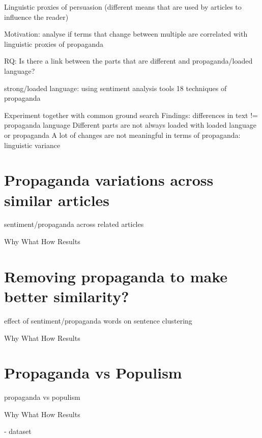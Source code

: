 \label{chap:linguistic_persuasion}

Linguistic proxies of persuasion (different means that are used by articles to influence the reader)

Motivation: analyse if terms that change between multiple are correlated with linguistic proxies of propaganda


RQ: Is there a link between the parts that are different and propaganda/loaded language? 


strong/loaded language: using sentiment analysis tools 
18 techniques of propaganda


Experiment together with common ground search
Findings: differences in text != propaganda language
Different parts are not always loaded with loaded language or propaganda
A lot of changes are not meaningful in terms of propaganda: linguistic variance


\section{Propaganda variations across similar articles}

sentiment/propaganda across related articles

Why
What
How
Results

\section{Removing propaganda to make better similarity?}

effect of sentiment/propaganda words on sentence clustering

Why
What
How
Results

\section{Propaganda vs Populism}

propaganda vs populism

Why
What
How
Results

- dataset
